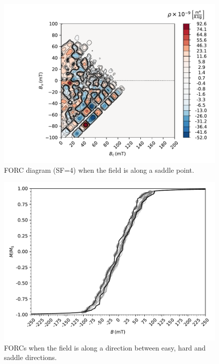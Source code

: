 \begin{figure}
\centering
\includegraphics[width=\textwidth]{research-4/figs/FORC_14_SF4.pdf}
\caption[FORC diagram when the field is along a saddle point]{FORC diagram (SF=4) when the field is along a saddle point.}
\label{FIG_07}
\end{figure}

\begin{figure}
\centering
\includegraphics[width=\textwidth]{research-4/figs/BM53_withFORCS.pdf}
\caption[FORCs when the field is along a direction between easy, hard and saddle directions]{FORCs when the field is along a direction between easy, hard and saddle directions.}
\label{FIG_08}
\end{figure}

